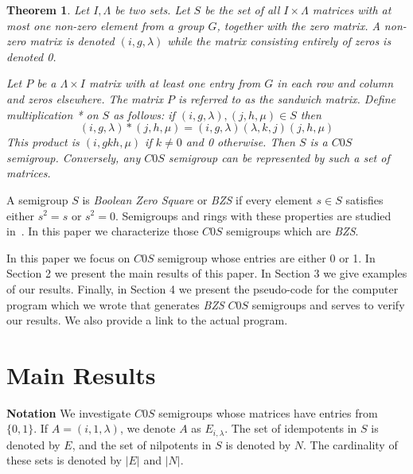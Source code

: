 \documentclass[12pt]{amsart}
\theoremstyle{plain}
\newtheorem{theorem}{Theorem}[section]
\theoremstyle{definition}
\begin{document}

\begin {theorem} \cite {cap, how}
\emph {Let $I, \Lambda$ be two sets. Let $S$ be the set of all $I \times \Lambda$ matrices with at most one non-zero element from a group $G$, together with the zero matrix. A non-zero matrix is denoted $(i, g, \lambda)$ while the matrix consisting entirely of zeros is denoted 0. } 

\emph {Let $P$ be a $\Lambda \times I$ matrix with at least one entry from $G$ in each row and column and zeros elsewhere. The matrix $P$ is referred to as the \emph {sandwich matrix}. Define multiplication * on $S$ as follows: if $(i, g, \lambda), (j, h, \mu) \in S$ then $$(i, g, \lambda) * (j, h, \mu) =  (i, g, \lambda) (\lambda, k, j) (j, h, \mu)$$ This product is $(i, gkh, \mu)$ if $k \neq 0$ and 0 otherwise. Then $S$ is a $C0S$ semigroup. Conversely, any $C0S$ semigroup can be represented by such a set of matrices.   }
\end {theorem}


A semigroup $S$ is \emph {Boolean Zero Square} or \emph {BZS} if every element $s \in S$ satisfies either $s^2 = s$ or $s^2 = 0$. Semigroups and rings with these properties are studied in~\cite{ft1, ft2, ft3, who}. In this paper we characterize those $C0S$ semigroups which are \emph {BZS}. 

In this paper we focus on $C0S$ semigroup whose entries are either 0 or 1. In Section 2 we present the main results of this paper. In Section 3 we give examples of our results. Finally, in Section 4 we present the pseudo-code for the computer program which we wrote that generates \emph {BZS} $C0S$ semigroups and serves to verify our results. We also provide a link to the actual program.


\section {Main Results}

\noindent \textbf {Notation} We investigate $C0S$ semigroups whose matrices have entries from $\{0,1\}$. If $A = (i, 1, \lambda)$,  we denote $A$ as $E_{i, \lambda}$. The set of idempotents in $S$ is denoted by $E$, and the set of nilpotents in $S$ is denoted by $N$. The cardinality of these sets is denoted by $\vert E \vert$ and $\vert N \vert$.
\end{document}
